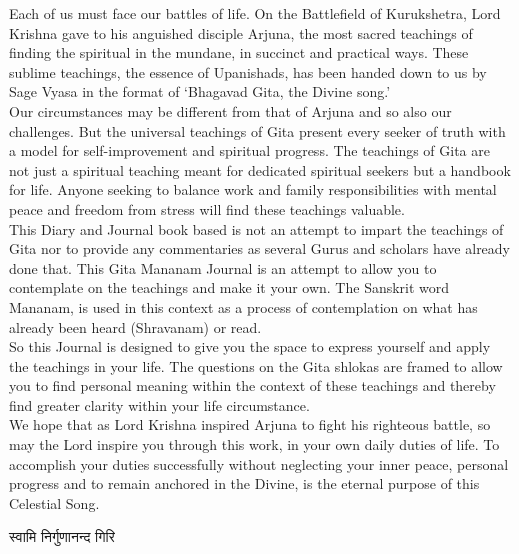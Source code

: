 {\small Each of us must face our battles of life. On the Battlefield of Kurukshetra, Lord Krishna gave to his anguished disciple Arjuna, the most sacred teachings of finding the spiritual in the mundane, in succinct and practical ways. These sublime teachings, the essence of Upanishads, has been handed down to us by Sage Vyasa in the format of ‘Bhagavad Gita, the Divine song.’\\


Our circumstances may be different from that of Arjuna and so also our challenges. But the universal teachings of Gita present every seeker of truth with a model for self-improvement and spiritual progress. 
The teachings of Gita are not just a spiritual teaching meant for dedicated spiritual seekers but a handbook for life. Anyone seeking to balance work and family responsibilities with mental peace and freedom from stress will find these teachings valuable.\\


This Diary and Journal book based is not an attempt to impart the teachings of Gita nor to provide any commentaries as several Gurus and scholars have already done that. This Gita Mananam Journal is an attempt to allow you to contemplate on the teachings and make it your own. The Sanskrit word Mananam, is used in this context as a process of contemplation on what has already been heard (Shravanam) or read.\\


So this Journal is designed to give you the space to express yourself and apply the teachings in your life. The questions on the Gita shlokas are framed to allow you to find personal meaning within the context of these teachings and thereby find greater clarity within your life circumstance. \\


We hope that as Lord Krishna inspired Arjuna to fight his righteous battle, so may the Lord inspire you through this work, in your own daily duties of life. To accomplish your duties successfully without neglecting your inner peace, personal progress and to remain anchored in the Divine, is the eternal purpose of this Celestial Song. \\}

स्वामि निर्गुणानन्द गिरि